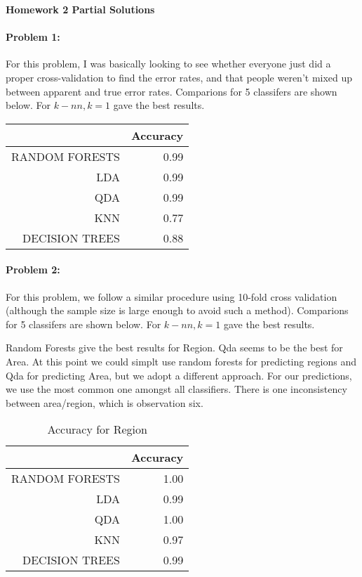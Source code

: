 \documentclass[12pt, leqno]{article}
\begin{document}
\pagestyle{fancy}

\begin{center}
{\large {\bf Homework 2 Partial Solutions}}
\end{center}

\paragraph{Problem 1:} For this problem, I was basically looking to
see whether everyone just did a proper cross-validation to find the
error rates, and that people weren't mixed up between apparent and
true error rates. Comparions for 5 classifers are shown below. For
$k-nn, k = 1$ gave the best results. 

 \begin{table}[ht]
\centering
\begin{tabular}{rr}
  \hline
 & Accuracy \\ 
  \hline
RANDOM FORESTS & 0.99 \\ 
  LDA & 0.99 \\ 
  QDA & 0.99 \\ 
  KNN & 0.77 \\ 
  DECISION TREES & 0.88 \\ 
   \hline
\end{tabular}
\end{table}

\newpage

\paragraph{Problem 2:} For this problem, we follow a similar procedure
using 10-fold cross validation (although the sample size is large
enough to avoid such a method). Comparions for 5 classifers are shown below. For
$k-nn, k = 1$ gave the best results. 

Random Forests give the best results for Region. Qda seems to be the best for Area. At this point we could simplt use random forests for predicting
regions and Qda for predicting Area, but we adopt a different
approach. For our predictions, we use the most common one amongst all
classifiers. There is one inconsistency between area/region, which is
observation six. 

\begin{table}[ht]
\centering
\begin{tabular}{rr}
  \hline
 & Accuracy \\ 
  \hline
RANDOM FORESTS & 1.00 \\ 
  LDA & 0.99 \\ 
  QDA & 1.00 \\ 
  KNN & 0.97 \\ 
  DECISION TREES & 0.99 \\ 
   \hline
\end{tabular}
\caption{Accuracy for Region}
\end{table}
\end{document}
